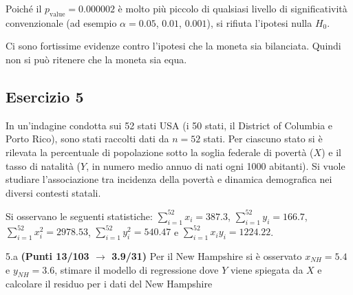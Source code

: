 \documentclass[
  11pt,
]{book}
\theoremstyle{mytheoremstyle}
\theoremstyle{mydefstyle}
\newenvironment{sol}
  {
  \begin{tcolorbox}[enhanced,breakable,arc=0.1mm,boxrule=1pt,colback=white,colframe=iblue,
  title=\bf \fontfamily{lmss}\selectfont \hspace{.5 cm} Soluzione,drop fuzzy shadow]

}{
\end{tcolorbox}
  }
\begin{document}
\begin{sol}
Poiché il \(p_\text{value} = 0.000002\) è molto più piccolo di qualsiasi livello di significatività convenzionale (ad esempio \(\alpha = 0.05\), \(0.01\), \(0.001\)), si rifiuta l'ipotesi nulla \(H_0\).

Ci sono fortissime evidenze contro l'ipotesi che la moneta sia bilanciata.
Quindi non si può ritenere che la moneta sia equa.

\end{sol}

\subsection{Esercizio 5}\label{esercizio-5-41}

In un'indagine condotta sui 52 stati USA (i 50 stati, il District of Columbia e Porto Rico), sono stati raccolti dati da \(n = 52\) stati. Per ciascuno stato si è rilevata la percentuale di popolazione sotto la soglia federale di povertà (\(X\)) e il tasso di natalità (\(Y\), in numero medio annuo di nati ogni 1000 abitanti). Si vuole studiare l'associazione tra incidenza della povertà e dinamica demografica nei diversi contesti statali.

Si osservano le seguenti statistiche:
\(\sum_{i=1}^{52}x_i=387.3\), \(\sum_{i=1}^{52}y_i=166.7\),
\(\sum_{i=1}^{52}x_i^2=2978.53\), \(\sum_{i=1}^{52}y_i^2=540.47\) e \(\sum_{i=1}^{52}x_iy_i=1224.22\).

5.a \textbf{(Punti 13/103 \(\rightarrow\) 3.9/31)} Per il New Hampshire si è osservato \(x_{NH}=5.4\) e \(y_{NH}=3.6\), stimare il modello di regressione dove \(Y\) viene spiegata da \(X\) e calcolare il residuo per i dati del New Hampshire
\end{document}
